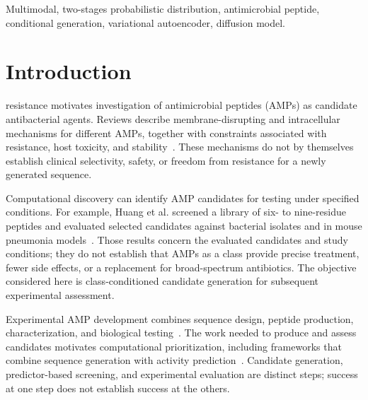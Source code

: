 \documentclass[journal]{IEEEtran}
\begin{document}
\begin{IEEEkeywords}
Multimodal, two-stages probabilistic distribution, antimicrobial peptide, conditional generation, variational autoencoder, diffusion model.
\end{IEEEkeywords}

\section{Introduction}
 resistance motivates investigation of antimicrobial peptides (AMPs) as candidate antibacterial agents. Reviews describe membrane-disrupting and intracellular mechanisms for different AMPs, together with constraints associated with resistance, host toxicity, and stability~\cite{huan2020antimicrobial,gan2021multifaceted}. These mechanisms do not by themselves establish clinical selectivity, safety, or freedom from resistance for a newly generated sequence.

Computational discovery can identify AMP candidates for testing under specified conditions. For example, Huang et al. screened a library of six- to nine-residue peptides and evaluated selected candidates against bacterial isolates and in mouse pneumonia models~\cite{huang2023identification}. Those results concern the evaluated candidates and study conditions; they do not establish that AMPs as a class provide precise treatment, fewer side effects, or a replacement for broad-spectrum antibiotics. The objective considered here is class-conditioned candidate generation for subsequent experimental assessment.

Experimental AMP development combines sequence design, peptide production, characterization, and biological testing~\cite{huan2020antimicrobial,gan2021multifaceted}. The work needed to produce and assess candidates motivates computational prioritization, including frameworks that combine sequence generation with activity prediction~\cite{li2021pepvae}. Candidate generation, predictor-based screening, and experimental evaluation are distinct steps; success at one step does not establish success at the others.
\end{document}
